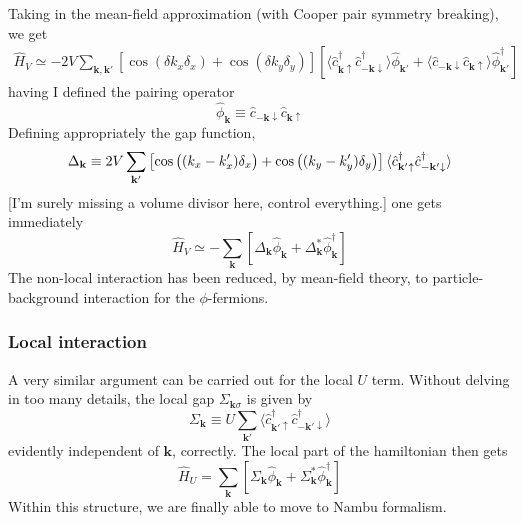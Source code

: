 Taking in the mean-field approximation (with Cooper pair symmetry breaking), we get
\[
\begin{aligned}
	\hat H_V \simeq - 2V\sum_{\mathbf{k}, \mathbf{k}'}
	\left[
		\cos \left(
			\delta k_x \delta_x
		\right)	+ \cos \left(
			\delta k_y \delta_y
		\right)	
	\right] \left[
		\langle 
			\hat c_{\mathbf{k}\uparrow}^\dagger \hat c_{-\mathbf{k} \downarrow}^\dagger
		\rangle \hat \phi_{\mathbf{k}'} + \langle 
			\hat c_{-\mathbf{k}\downarrow} \hat c_{\mathbf{k} \uparrow}
		\rangle \hat \phi_{\mathbf{k}'}^\dagger
	\right]	
\end{aligned}
\]
having I defined the pairing operator 
\[
	\hat \phi_\mathbf{k} \equiv \hat c_{-\mathbf{k}\downarrow} \hat c_{\mathbf{k} \uparrow}
\]
Defining appropriately the gap function,
\begin{equation}\label{eq:gap-function-definition}
	\Delta_\mathbf{k} \equiv 2V \sum_{\mathbf{k}'} \left[
		\cos \left(
			\vphantom{A^A}
			(k_x-k_x') \delta_x
		\right)	+ \cos \left(
			\vphantom{A^A}
			(k_y-k_y') \delta_y
		\right)	
	\right] \langle 
		\hat c_{\mathbf{k}'\uparrow}^\dagger \hat c_{-\mathbf{k}' \downarrow}^\dagger
	\rangle
\end{equation}
{\color{tabred}[I'm surely missing a volume divisor here, control everything.]} one gets immediately
\begin{equation}\label{eq:extended-hubbard-nonlocal-interaction-mean-field-reciprocal}
	\hat H_V \simeq - \sum_\mathbf{k} \left[
		\Delta_\mathbf{k} \hat \phi_\mathbf{k} + \Delta_\mathbf{k}^* \hat \phi_\mathbf{k}^\dagger
	\right]	
\end{equation}
The non-local interaction has been reduced, by mean-field theory, to particle-background interaction for the $\phi$-fermions.

\subsubsection*{Local interaction}

A very similar argument can be carried out for the local $U$ term. Without delving in too many details, the local gap $\Sigma_{\mathbf{k}\sigma}$ is given by
\begin{equation}\label{eq:sgap-function-definition}
	\Sigma_\mathbf{k} \equiv U \sum_{\mathbf{k}'} \langle 
	\hat c_{\mathbf{k}'\uparrow}^\dagger \hat c_{-\mathbf{k}' \downarrow}^\dagger
	\rangle
\end{equation}
evidently independent of $\mathbf{k}$, correctly. The local part of the hamiltonian then gets
\begin{equation}\label{eq:extended-hubbard-local-interaction-mean-field-reciprocal}
	\hat H_U = \sum_\mathbf{k} \left[
		\Sigma_\mathbf{k} \hat \phi_\mathbf{k} + \Sigma_\mathbf{k}^* \hat \phi_\mathbf{k}^\dagger
	\right]	
\end{equation}
Within this structure, we are finally able to move to Nambu formalism.

